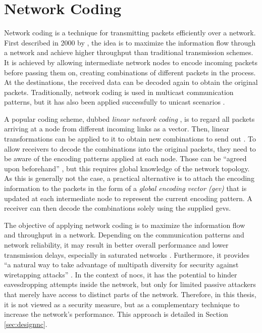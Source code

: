 \section{Network Coding}\label{sec:networkcodingfun}
Network coding is a technique for transmitting packets efficiently over a network. First described in 2000 by \citeauthor{ahlswede00networkflow}
\cite{ahlswede00networkflow}, the idea is to maximize the information flow through a network and achieve higher throughput than traditional transmission
schemes. It is achieved by allowing intermediate network nodes to encode incoming packets before passing them on, creating combinations of different
packets in the process. At the destinations, the received data can be decoded again to obtain the original packets. Traditionally, network coding is
used in multicast communication patterns, but it has also been applied successfully to unicast scenarios \cite[e.g.][]{moriam15manycorenc}.

A popular coding scheme, dubbed \textit{linear network coding} \cite{li03linearnc}, is to regard all packets arriving at a node from different incoming links as a vector.
Then, linear transformations can be applied to it to obtain new combinations to send out \cite[1]{li03linearnc}. To allow receivers to decode the
combinations into the original packets, they need to be aware of the encoding patterns applied at each node. Those can be \enquote{agreed upon
beforehand} \cite[1]{li03linearnc}, but this requires global knowledge of the network topology. As this is generally not the case, a practical
alternative is to attach the encoding information to the packets in the form of a \textit{global encoding vector (\gls{gev})}
\cites[2\psqq]{chou03practicalnc}[5\psq]{chou07ncforinternetandwireless} that is updated at each intermediate node to represent the current encoding
pattern. A receiver can then decode the combinations solely using the supplied \glspl{gev}.

The objective of applying network coding is to maximize the information flow and throughput in a network. Depending on the communication patterns and
network reliability, it may result in better overall performance and lower transmission delays, especially in saturated networks
\cite[7]{duongba11ncinmulticore}. Furthermore, it provides \enquote{a natural way to take advantage of multipath diversity for security against
wiretapping attacks} \cite[8]{fragouli07ncfundamentals}. In the context of \glspl{noc}, it has the potential to hinder eavesdropping attempts inside
the network, but only for limited passive attackers that merely have access to distinct parts of the network. Therefore, in this thesis, it is not
viewed as a security measure, but as a complementary technique to increase the network's performance. This approach is detailed in Section
\ref{sec:designnc}.
